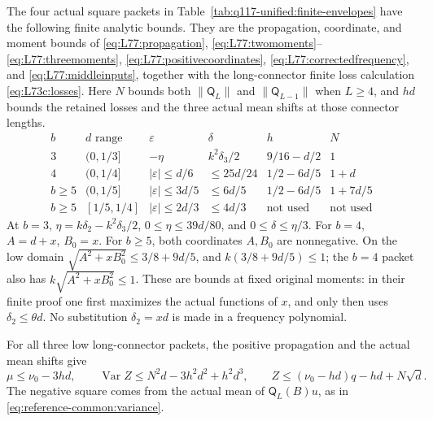 The four actual square packets in
Table~\ref{tab:q117-unified:finite-envelopes} have the following
finite analytic bounds. They are the propagation, coordinate, and
moment bounds of \eqref{eq:L77:propagation},
\eqref{eq:L77:twomoments}--\eqref{eq:L77:threemoments},
\eqref{eq:L77:positivecoordinates},
\eqref{eq:L77:correctedfrequency}, and
\eqref{eq:L77:middleinputs}, together with the long-connector
finite loss calculation \eqref{eq:L73c:losses}.
Here \(N\) bounds both \(\|\mathsf Q_L\|\) and
\(\|\mathsf Q_{L-1}\|\) when \(L\ge4\), and
\(h d\) bounds the retained losses and the three actual mean
shifts at those connector lengths.
\begin{equation}\label{eq:q117-unified:square-packet-data}
\begin{array}{c|c|c|c|c|c}
 b& d\text{ range}&\varepsilon&\delta&h&N\\\hline
 3&(0,1/3]&-\eta&k^2\delta_3/2&9/16-d/2&1\\
 4&(0,1/4]&|\varepsilon|\le d/6&\le25d/24&1/2-6d/5&1+d\\
 b\ge5&(0,1/5]&|\varepsilon|\le3d/5&\le6d/5&1/2-6d/5&1+7d/5\\
 b\ge5&[1/5,1/4]&|\varepsilon|\le2d/3&\le4d/3&\text{not used}&\text{not used}
\end{array}
\end{equation}
At \(b=3\), \(\eta=k\delta_2-k^2\delta_3/2\),
\(0\le\eta\le39d/80\), and \(0\le\delta\le\eta/3\).
For \(b=4\), \(A=d+x\), \(B_0=x\).
For \(b\ge5\), both coordinates \(A,B_0\) are nonnegative.
On the low domain \(\sqrt{A^2+xB_0^2}\le3/8+9d/5\), and
\(k(3/8+9d/5)\le1\); the \(b=4\) packet also has
\(k\sqrt{A^2+xB_0^2}\le1\).
These are bounds at fixed original moments: in their finite proof
one first maximizes the actual functions of \(x\), and only then
uses \(\delta_2\le\theta d\). No substitution \(\delta_2=xd\)
is made in a frequency polynomial.

For all three low long-connector packets, the positive propagation
and the actual mean shifts give
\begin{equation}\label{eq:q117-unified:long-square-moments}
 \mu\le\nu_0-3hd,\qquad
 \operatorname{Var}Z\le N^2d-3h^2d^2+h^2d^3,
 \qquad
 Z\le(\nu_0-hd)q-hd+N\sqrt d.
\end{equation}
The negative square comes from the actual mean of
\(\mathsf Q_L(B)u\), as in
\eqref{eq:reference-common:variance}.

